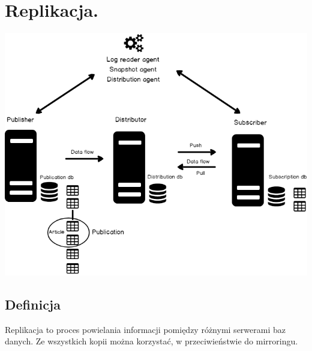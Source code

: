 \documentclass[a4paper]{article}
\begin{document}
    \section{Replikacja.}
    \begin{center}
        \includegraphics[width=\textwidth]{replication}
    \end{center}

    \subsection{Definicja}
    Replikacja to proces powielania informacji pomiędzy różnymi serwerami baz danych. Ze wszystkich kopii można korzystać,
    w przeciwieństwie do mirroringu.
\end{document}
